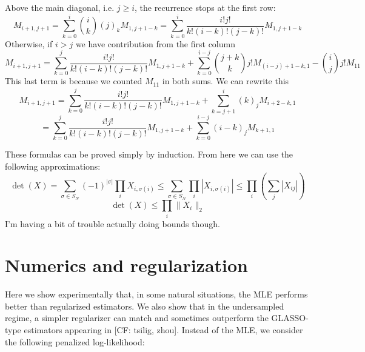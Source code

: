 \documentclass{article}
\newcommand{\CF}[1]{{\color{purple}[CF: #1]}}
\begin{document}
Above the main diagonal, i.e. $j \geq i$, the recurrence stops at the first row:
\[ M_{i+1,j+1} = \sum_{k=0}^{i} {i \choose k} (j)_{k} M_{1,j+1-k} = \sum_{k=0}^{i} \frac{i! j!}{k! (i-k)! (j-k)!} M_{1,j+1-k}     \]
Otherwise, if $i > j$ we have contribution from the first column
\[ M_{i+1,j+1} = \sum_{k=0}^{j} \frac{i! j!}{k! (i-k)! (j-k)!} M_{1,j+1-k} + \sum_{k=0}^{i-j} {j+k \choose k} j! M_{(i-j) +1-k,1} - {i \choose j} j! M_{11}    \]
This last term is because we counted $M_{11}$ in both sums. We can rewrite this 
\[ M_{i+1,j+1} = \sum_{k=0}^{j} \frac{i! j!}{k! (i-k)! (j-k)!} M_{1,j+1-k} + \sum_{k=j+1}^{i} (k)_{j} M_{i+2-k,1}    \]
\[ = \sum_{k=0}^{j} \frac{i! j!}{k! (i-k)! (j-k)!} M_{1,j+1-k} +  \sum_{k=0}^{i-j} (i-k)_{j} M_{k+1,1}   \]

These formulas can be proved simply by induction. From here we can use the following approximations:
\[ \det(X) = \sum_{\sigma \in S_{N}} (-1)^{|\sigma|} \prod_{i} X_{i,\sigma(i)} \leq \sum_{\sigma \in S_{N}} \prod_{i} |X_{i,\sigma(i)}| \leq \prod_{i} \left( \sum_{j} |X_{ij}| \right)     \]
\[ \det(X) \leq \prod_{i} \|X_{i}\|_{2}     \]
I'm having a bit of trouble actually doing bounds though. 

\section{Numerics and regularization}
Here we show experimentally that, in some natural situations, the MLE performs better than regularized estimators. We also show that in the undersampled regime, a simpler regularizer can match and sometimes outperform the GLASSO-type estimators appearing in \CF{tsilig, zhou}. Instead of the MLE, we consider the following penalized log-likelihood: 
\end{document}
